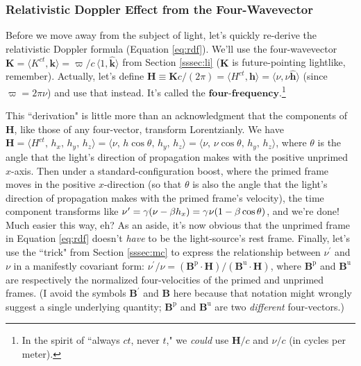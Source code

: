 \documentclass[12pt]{article}
\renewcommand{\vv}[1]{\mathbf{#1}}
\begin{document}
\subsubsection{Relativistic Doppler Effect from the Four-Wavevector}\label{sssec:doppler2}

Before we move away from the subject of light, let's quickly re-derive the relativistic Doppler formula (Equation \ref{eq:rdf}). We'll use the four-wavevector ${\vv K = \langle K^{ct}, \vv k \rangle = \varpi / c \, \langle 1, \vv{\hat{k}} \rangle }$ from Section \ref{sssec:li} ($\vv K$ is future-pointing lightlike, remember). Actually, let's define ${\vv H \equiv \vv K c / (2 \pi) = \langle H^{ct}, \vv h \rangle = \langle \nu, \nu \vv{\hat{h}} \rangle }$ (since $\varpi = 2 \pi \nu$) and use that instead. It's called the $\textbf{four-frequency}$.\footnote{In the spirit of ``always $ct$, never $t$," we \emph{could} use $\vv H/c$ and $\nu / c$ (in cycles per meter).}

This ``derivation" is little more than an acknowledgment that the components of $\vv H$, like those of any four-vector, transform Lorentzianly. We have ${\vv H = \langle H^{ct}, \, h_x, \, h_y, \, h_z \rangle = \langle \nu , \, h \cos \theta, \, h_y, \, h_z \rangle = \langle \nu , \, \nu \cos \theta, \, h_y, \, h_z \rangle}$, where $\theta$ is the angle that the light's direction of propagation makes with the positive unprimed $x$-axis. Then under a standard-configuration boost, where the primed frame moves in the positive $x$-direction (so that $\theta$ is also the angle that the light's direction of propagation makes with the primed frame's velocity), the time component transforms like $\nu^{\mkern.75mu \prime} = \gamma (\nu - \beta h_x ) = \gamma \mkern1mu \nu (1 - \beta \cos \theta)$, and we're done! Much easier this way, eh? As an aside, it's now obvious that the unprimed frame in Equation \ref{eq:rdf} doesn't \emph{have} to be the light-source's rest frame. Finally, let's use the ``trick" from Section \ref{sssec:mc} to express the relationship between $\nu ^{\prime}$ and $\nu$ in a manifestly covariant form: $\nu ^{\prime} / \nu = (\vv B^{\textrm{p}} \cdot \vv H) / (\vv B^{\textrm{u}} \cdot \vv H)$, where $\vv B^{\textrm{p}}$ and $\vv B^{\textrm{u}}$ are respectively the normalized four-velocities of the primed and unprimed frames. (I avoid the symbols $\vv B ^{\prime}$ and $\vv B$ here because that notation might wrongly suggest a single underlying quantity; $\vv B^{\textrm{p}}$ and $\vv B^{\textrm{u}}$ are two \emph{different} four-vectors.)
\end{document}
